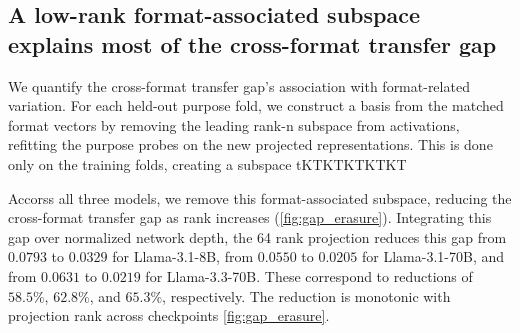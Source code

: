 \subsection{A low-rank format-associated subspace explains most of the cross-format transfer gap}
\label{sec:results_projection}

We quantify the cross-format transfer gap's association with format-related variation. 
For each held-out purpose fold, we construct a basis from the matched format %
vectors by removing the leading rank-n subspace from activations, refitting the purpose probes on the new projected representations. 
This is done only on the training folds, creating a subspace tKTKTKTKTKT

Accorss all three models,  we remove this format-associated subspace, reducing the cross-format transfer gap as rank increases (\ref{fig:gap_erasure}).
Integrating this gap over normalized network depth, the 64 rank projection reduces this gap from \(0.0793\) to \(0.0329\) for Llama-3.1-8B, from \(0.0550\) to \(0.0205\) for Llama-3.1-70B, and from \(0.0631\) to \(0.0219\) for Llama-3.3-70B. These correspond to reductions of \(58.5\%\), \(62.8\%\), and \(65.3\%\), respectively. The reduction is monotonic with projection rank across checkpoints \ref{fig:gap_erasure}.

